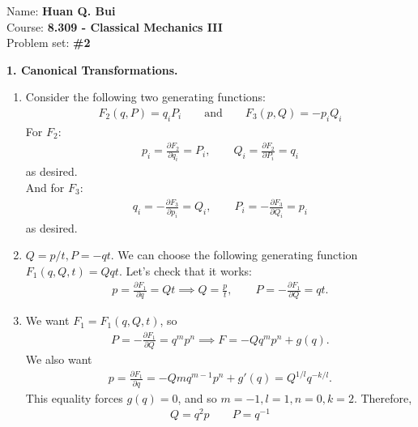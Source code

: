 \documentclass{article}
\theoremstyle{definition}
\newcommand{\p}{\partial}
\newcommand{\f}[2]{\frac{#1}{#2}}
\begin{document}
	
\begin{framed}
	\noindent Name: \textbf{Huan Q. Bui}\\
	Course: \textbf{8.309 - Classical Mechanics III}\\
	Problem set: \textbf{\#2}
\end{framed}


\noindent \textbf{1. Canonical Transformations.}


\begin{enumerate}[label=(\alph*)]
	\item Consider the following two generating functions:
	\begin{align*}
	\boxed{F_2(q,P) = q_iP_i \quad\quad\text{and}\quad\quad F_3(p,Q) = -p_iQ_i}
	\end{align*}
	For $F_2$:
	\begin{align*}
	p_i = \f{\p F_2}{\p q_i} = P_i, \quad\quad Q_i = \f{\p F_2}{\p P_i} = q_i
	\end{align*}
	as desired. \\
	
	And for $F_3$:
	\begin{align*}
	q_i = -\f{\p F_3}{\p p_i} = Q_i, \quad\quad P_i = -\f{\p F_3}{\p Q_i} = p_i
	\end{align*}
	as desired. 
	
	
	\item $Q = p/t, P = -qt$. We can choose the following generating function $\boxed{F_1(q,Q,t) = Qqt}$. Let's check that it works:
	\begin{align*}
	p = \f{\p F_1}{\p q} = Qt \implies Q = \f{p}{t},\quad\quad P = -\f{\p F_1}{\p Q} = qt.
	\end{align*}
	
	
	\item We want $F_1 = F_1(q,Q,t)$, so 
	\begin{align*}
	P = -\f{\p F_1}{\p Q} = q^m p^n \implies F = -Qq^m p^n + g(q).
	\end{align*}
	We also want
	\begin{align*}
	p = \f{\p F_1}{\p q} = -Q m q^{m-1} p^n + g'(q) = Q^{1/l}q^{-k/l}.
	\end{align*}
	This equality forces $g(q) = 0$, and so $m=-1,l=1,n=0,k=2$. Therefore,
	\begin{align*}
	\boxed{Q = q^2p \quad\quad P = q^{-1}}
	\end{align*}
	

\end{enumerate}
\end{document}
